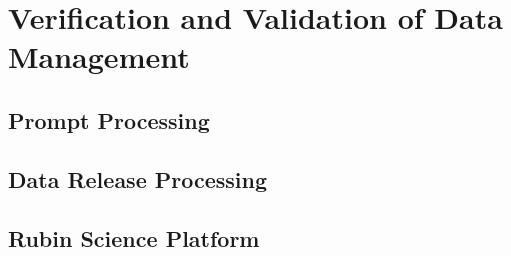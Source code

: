 \section{Verification and Validation of Data Management}


\subsection{Prompt Processing}


\subsection{Data Release Processing}


\subsection{Rubin Science Platform}
